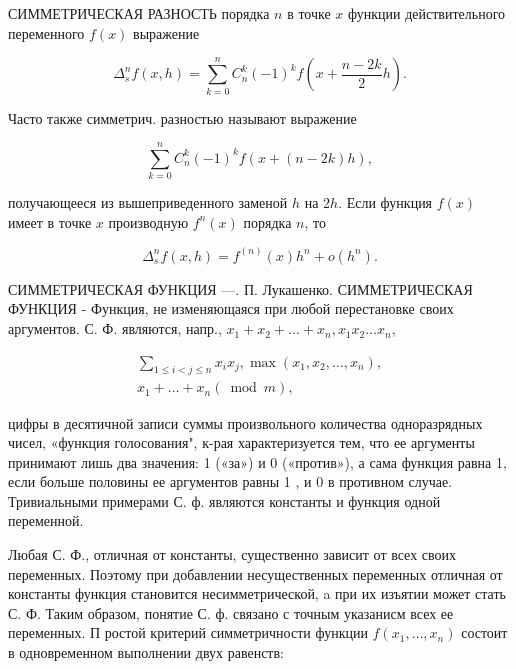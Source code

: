 \documentclass[10pt]{article}
\begin{document}
СИММЕТРИЧЕСКАЯ РАЗНОСТЬ порядка $n$ в точке $x$ функции действительного переменного $f(x)$ выражение



\[

\Delta_{s}^{n} f(x, h)=\sum_{k=0}^{n} C_{n}^{k}(-1)^{k} f\left(x+\frac{n-2 k}{2} h\right) .

\]



Часто также симметрич. разностью называют выражение



\[

\sum_{k=0}^{n} C_{n}^{k}(-1)^{k} f(x+(n-2 k) h),

\]



получающееся из вышеприведенного заменой $h$ на $2 h$. Если функция $f(x)$ имеет в точке $x$ производную $f^{n}(x)$ порядка $n$, то



\[

\Delta_{s}^{n} f(x, h)=f^{(n)}(x) h^{n}+o\left(h^{n}\right) .

\]



СИММЕТРИЧЕСКАЯ ФУНКЦИЯ —. П. Лукашенко. СИММЕТРИЧЕСКАЯ ФУНКЦИЯ - Функция, не изменяющаяся при любой перестановке своих аргументов. С. Ф. являются, напр., $x_{1}+x_{2}+\ldots+x_{n}, x_{1} x_{2} \ldots x_{n}$,



\[

\begin{gathered}

\sum_{1 \leqslant i<j \leqslant n} x_{i} x_{j}, \max \left(x_{1}, x_{2}, \ldots, x_{n}\right), \\

x_{1}+\ldots+x_{n}(\bmod m),

\end{gathered}

\]



цифры в десятичной записи суммы произвольного количества одноразрядных чисел, «функция голосования", к-рая характеризуется тем, что ее аргументы принимают лишь два значения: 1 («за») и 0 («против»), а сама функция равна 1, если больше половины ее аргументов равны 1 , и 0 в противном случае. Тривиальными примерами С. ф. являются константы и функция одной переменной.



Любая С. Ф., отличная от константы, существенно зависит от всех своих переменных. Поэтому при добавлении несущественных переменных отличная от константы функция становится несимметрической, a при их изъятии может стать С. Ф. Таким образом, понятие С. ф. связано с точным указанисм всех ее переменных. П ростой критерий симметричности функции $f\left(x_{1}, \ldots, x_{n}\right)$ состоит в одновременном выполнении двух равенств:
\end{document}
